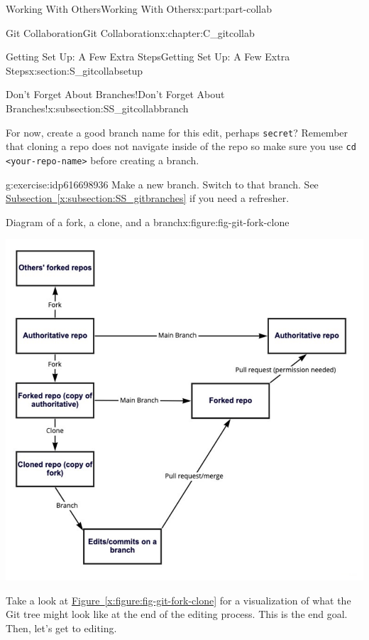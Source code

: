 \documentclass[oneside,10pt,]{book}
\newcommand{\xreffont}{\relax}
\newcommand{\mono}[1]{\texttt{#1}}
\begin{document}
\begin{partptx}{Working With Others}{}{Working With Others}{}{}{x:part:part-collab}
\begin{chapterptx}{Git Collaboration}{}{Git Collaboration}{}{}{x:chapter:C_gitcollab}
\begin{sectionptx}{Getting Set Up: A Few Extra Steps}{}{Getting Set Up: A Few Extra Steps}{}{}{x:section:S_gitcollabsetup}
\begin{subsectionptx}{Don't Forget About Branches!}{}{Don't Forget About Branches!}{}{}{x:subsection:SS_gitcollabbranch}
\par
For now, create a good branch name for this edit, perhaps \mono{secret}? Remember that cloning a repo does not navigate inside of the repo so make sure you use \mono{cd <your-repo-name>} before creating a branch.%
\begin{inlineexercise}{}{g:exercise:idp616698936}%
Make a new branch. Switch to that branch. See \hyperref[x:subsection:SS_gitbranches]{Subsection~{\xreffont\ref{x:subsection:SS_gitbranches}}} if you need a refresher.%
\end{inlineexercise}%
\begin{figureptx}{Diagram of a fork, a clone, and a branch}{x:figure:fig-git-fork-clone}{}%
\begin{image}{0.1}{0.8}{0.1}%
\includegraphics[width=\linewidth]{external/git_fork_clone.pdf}
\end{image}%
\tcblower
\end{figureptx}%
Take a look at \hyperref[x:figure:fig-git-fork-clone]{Figure~{\xreffont\ref{x:figure:fig-git-fork-clone}}} for a visualization of what the Git tree might look like at the end of the editing process. This is the end goal. Then, let's get to editing.%
\end{subsectionptx}
\end{sectionptx}
%
%
\typeout{************************************************}

\end{chapterptx}
\end{partptx}
\end{document}
